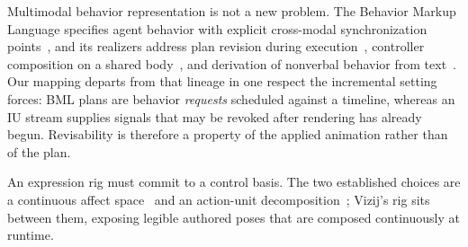 \documentclass[conference]{IEEEtran}
\begin{document}
%
%
Multimodal behavior representation is not a new problem. The Behavior Markup
Language specifies agent behavior with explicit cross-modal synchronization
points~\cite{kopp2006bml}, and its realizers address plan revision during
execution~\cite{welbergen2009elckerlyc}, controller composition on a shared
body~\cite{thiebaux2008smartbody}, and derivation of nonverbal behavior from
text~\cite{cassell2004beat}. Our mapping departs from that lineage in one
respect the incremental setting forces: BML plans are behavior
\emph{requests} scheduled against a timeline, whereas an IU stream supplies
signals that may be revoked after rendering has already begun. Revisability
is therefore a property of the applied animation rather than of the plan.

%
An expression rig must commit to a control basis. The two established
choices are a continuous affect space~\cite{russell1980circumplex} and an
action-unit decomposition~\cite{ekman1978facs}; Vizij's rig sits between
them, exposing legible authored poses that are composed continuously at
runtime.
\end{document}

